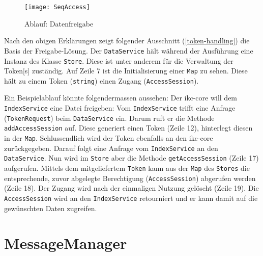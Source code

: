 
    \begin{figure}[H]
    \centering
    \texttt{[image: SeqAccess]}
    \caption{Ablauf: Datenfreigabe}
    \label{fig:seqaccesssession}
    \end{figure}
    
    
Nach den obigen Erklärungen zeigt folgender Ausschnitt (\autoref{token-handling}) die Basis der Freigabe-Lösung. Der \texttt{DataService} hält wäh\-rend der Ausführung eine Instanz des Klasse \texttt{Store}. Diese ist unter anderem für die Verwaltung der \gls{Token}[s] zuständig. Auf Zeile 7 ist die Initialisierung einer \texttt{Map} zu sehen. Diese hält zu einem Token (\texttt{string}) einen Zugang (\texttt{AccessSession}). 

Ein Beispielablauf könnte folgendermassen aussehen: Der \gls{ikc-core} will dem \texttt{IndexService} eine Datei freigeben: Vom \texttt{IndexService} trifft eine Anfrage (\texttt{TokenRequest}) beim \texttt{DataService} ein. Darum ruft er die Methode \texttt{addAccessSession} auf. Diese generiert einen \gls{Token} (Zeile 12), hinterlegt diesen in der \texttt{Map}. Schlussendlich wird der \gls{Token} ebenfalls an den \gls{ikc-core} zurückgegeben. Darauf folgt eine Anfrage vom \texttt{IndexService} an den \texttt{DataService}. Nun wird im \texttt{Store} aber die Methode \texttt{getAccessSession} (Zeile 17) aufgerufen. Mittels dem mitgeliefertem \texttt{Token} kann aus der \texttt{Map} des \texttt{Stores} die entsprechende, zuvor abgelegte Berechtigung (\texttt{AccessSession}) abgerufen werden (Zeile 18). Der Zugang wird nach der einmaligen Nutzung gelöscht (Zeile 19). Die \texttt{AccessSession} wird an den \texttt{IndexService} retourniert und er kann damit auf die gewünschten Daten zugreifen.
    
  


\section{MessageManager}\label{s-message-manager}


